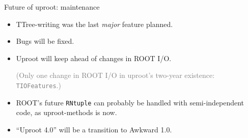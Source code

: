 \documentclass[aspectratio=169]{beamer}
\begin{document}
\begin{frame}{Future of uproot: maintenance}
\Large
\vspace{0.35 cm}
\begin{itemize}\setlength{\itemsep}{0.25 cm}
\item<1-> TTree-writing was the last {\it major} feature planned.
\item<2-> Bugs will be fixed.
\item<3-> Uproot will keep ahead of changes in ROOT I/O.

\vspace{0.05 cm}
\textcolor{gray}{\normalsize (Only one change in ROOT I/O in uproot's two-year existence: \texttt{TIOFeatures}.)}

\item<4-> ROOT's future \texttt{RNtuple} can probably be handled with semi-independent code, as uproot-methods is now.
\item<5-> ``Uproot 4.0'' will be a transition to Awkward 1.0.
\end{itemize}

\normalsize
\vspace{0.25 cm}
\end{frame}
\end{document}
